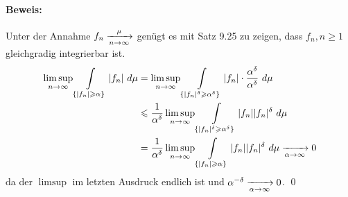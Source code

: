 \paragraph{Beweis:}Unter der Annahme $f_n\nto{\mu}{n\to\infty}$ gen\"ugt es mit Satz 9.25 zu zeigen, dass $f_n,n\geq1$ gleichgradig integrierbar ist.
\begin{align*}
    \limsup_{n\to\infty}\int\displaylimits_{\{|f_n|\geq\alpha\}}|f_n|\ d\mu&= \limsup_{n\to\infty}\int\displaylimits_{\{|f_n|^\delta\geq\alpha^\delta\}}|f_n|\cdot\dfrac{\alpha^\delta}{\alpha^\delta}\ d\mu\\ 
    &\leq\dfrac{1}{\alpha^\delta}\limsup_{n\to\infty}\int\displaylimits_{\{|f_n|^\delta\geq\alpha^\delta\}}|f_n||f_n|^\delta\ d\mu \\
    &=\dfrac{1}{\alpha^\delta}\limsup_{n\to\infty}\int\displaylimits_{\{|f_n|\geq\alpha\}}|f_n||f_n|^\delta\ d\mu\nto{}{\alpha\to\infty}0
\end{align*}
da der $\limsup$ im letzten Ausdruck endlich ist und $\alpha^{-\delta}\nto{}{\alpha\to\infty}0$. \qed

